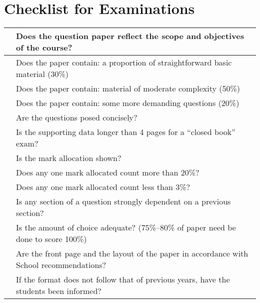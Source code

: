 \documentclass{ArcHandout}
\begin{document}
\section{Checklist for Examinations}
\begin{tabular}{|p{5mm}|p{}|}\hline
&Does the question paper reflect the scope and objectives of the
  course?\\\hline
&Does the paper contain: a proportion of straightforward basic material
(30\%)\\
&Does the paper contain: material of moderate complexity (50\%)\\
&Does the paper contain: some more demanding questions (20\%)\\\hline
&Are the questions posed concisely?\\\hline
&Is the supporting data longer than 4 pages for a ``closed book''
  exam?\\\hline
&Is the mark allocation shown? \\\hline
&Does any one mark allocated count more than 20\%?\\\hline
&Does any one mark allocated count less than 3\%?\\\hline
&Is any section of a question strongly dependent on a previous
  section?\\\hline
&Is the amount of choice adequate? (75\%--80\% of paper need be
  done to score 100\%)\\\hline
&Are the front page and the layout of the paper in accordance with
  School recommendations? \\\hline
&If the format does not follow that of previous
  years, have the students been informed?\\\hline
\end{tabular}
\end{document}
